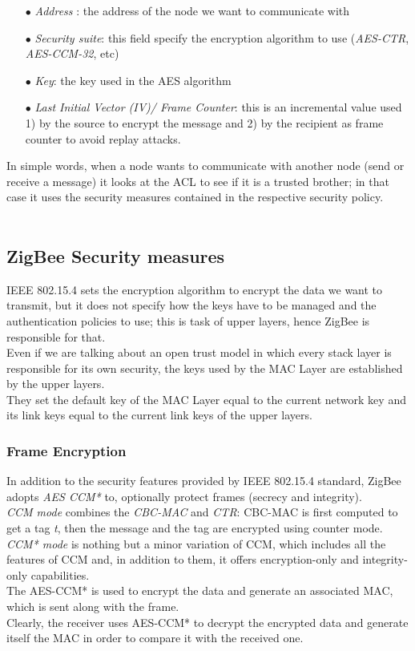 \documentclass[12pt]{report}
\begin{document}
\begin{itemize}
\setlength{\itemindent}{+4mm}
\item[$\bullet$] \emph{Address }: the address of the node we want to communicate with
\item[$\bullet$] \emph{Security suite}: this field specify the encryption algorithm to use (\emph{AES-CTR}, \emph{AES-CCM-32}, etc)
\item[$\bullet$] \emph{Key}: the key used in the AES algorithm
\item[$\bullet$] \emph{Last Initial Vector (IV)/ Frame Counter}: this is an incremental value used 1) by the source to encrypt the message and 2) by the recipient as frame counter to avoid replay attacks.\\
\end{itemize}

In simple words, when a node wants to communicate with another node (send or receive a message) it looks at the ACL to see if it is a trusted brother; in that case it uses the security measures contained in the respective security policy.\\\\

\subsection{ZigBee Security measures}
\bigskip
IEEE 802.15.4 sets the encryption algorithm to encrypt the data we want to transmit, but it does not specify how the keys have to be managed and the authentication policies to use; this is task of upper layers, hence ZigBee is responsible for that.\\
Even if we are talking about an open trust model in which every stack layer is responsible for its own security, the keys used by the MAC Layer are established by the upper layers.\\
They set the default key of the MAC Layer equal to the current network key and its link keys equal to the current link keys of the upper layers.

\subsubsection{Frame Encryption}
\bigskip
In addition to the security features provided by IEEE 802.15.4 standard,  ZigBee adopts \emph{AES CCM*} to, optionally protect frames (secrecy and integrity).\\
\emph{CCM mode} combines the \emph{CBC-MAC} and \emph{CTR}: CBC-MAC is first computed to get a tag \emph{t}, then the message and the tag are encrypted using counter mode.\\
\emph{CCM* mode} is nothing but a minor variation of CCM, which includes all the features of CCM and, in addition to them, it offers encryption-only and integrity-only capabilities.\\
The AES-CCM* is used to encrypt the data and generate an associated MAC, which is sent along with the frame.\\
Clearly, the receiver uses AES-CCM* to decrypt the encrypted data and generate itself the MAC in order to compare it with the received one.
\end{document}
